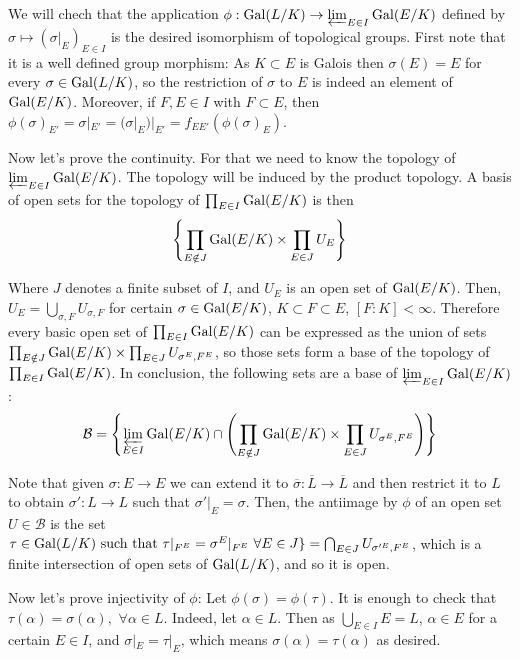 \begin{sol}
	We will chech that the application $\phi: \mathrm{Gal}(L/K) \to \varprojlim_{E \in I} \mathrm{Gal}(E/K)$ defined by $\sigma \mapsto (\sigma|_E)_{E \in I}$ is the desired isomorphism of topological groups. First note that it is a well defined group morphism: As $K \subset E$ is Galois then $\sigma(E) = E$ for every $\sigma \in \mathrm{Gal}(L/K)$, so the restriction of $\sigma$ to $E$ is indeed an element of $\mathrm{Gal}(E/K)$. Moreover, if $F,E \in I$ with $F \subset E$, then $\phi(\sigma)_{E'} = \sigma|_{E'} = (\sigma|_E)|_{E'} = f_{EE'}(\phi(\sigma)_E)$.

	Now let's prove the continuity. For that we need to know the topology of $\varprojlim_{E \in I} \mathrm{Gal}(E/K)$. The topology will be induced by the product topology. A basis of open sets for the topology of $\prod_{E \in I} \mathrm{Gal}(E/K)$ is then 
	\[
		\left \{\prod_{E \notin J} \mathrm{Gal}(E/K) \times \prod_{E \in J} U_E \right \}
	\] 

	Where $J$ denotes a finite subset of $I$, and $U_E$ is an open set of $\mathrm{Gal}(E/K)$. Then, $U_E = \bigcup_{\sigma, F} U_{\sigma,F}$ for certain $\sigma \in \mathrm{Gal}(E/K)$, $K \subset F \subset E$, $[F:K] < \infty$. Therefore every basic open set of $\prod_{E \in I} \mathrm{Gal}(E/K)$ can be expressed as the union of sets $\prod_{E \notin J} \mathrm{Gal}(E/K) \times \prod_{E \in J} U_{\sigma^E, F^E}$, so those sets form a base of the topology of $\prod_{E \in I} \mathrm{Gal}(E/K)$. In conclusion, the following sets are a base of $\varprojlim_{E \in I} \mathrm{Gal}(E/K)$:
	\[
		\mathcal{B} = \left \{ \varprojlim_{E \in I} \mathrm{Gal}(E/K) \cap  \left ( \prod_{E \notin J} \mathrm{Gal}(E/K) \times \prod_{E \in J} U_{\sigma^E, F^E} \right ) \right \}
	\]

	Note that given $\sigma: E \to E$ we can extend it to $\overline{\sigma}: \overline{L} \to \overline{L}$ and then restrict it to $L$ to obtain $\sigma': L \to L$ such that $\sigma'|_E = \sigma$. Then, the antiimage by $\phi$ of an open set $U \in \mathcal{B}$ is the set $\tau \in \mathrm{Gal}(L/K) \text{ such that } \tau|_{F^E} = \sigma^E|_{F^E} \, \, \forall E \in J\} = \bigcap_{E \in J} U_{\sigma'^E, F^E}$, which is a finite intersection of open sets of $\mathrm{Gal}(L/K)$, and so it is open.

	Now let's prove injectivity of $\phi$: Let $\phi(\sigma) = \phi(\tau)$. It is enough to check that $\tau(\alpha) = \sigma(\alpha), \, \, \forall \alpha \in L$. Indeed, let $\alpha \in L$. Then as $\bigcup_{E \in I} E = L$, $\alpha \in E$ for a certain $E \in I$, and $\sigma|_E = \tau|_E$, which means $\sigma(\alpha) = \tau(\alpha)$ as desired.


\end{sol}
